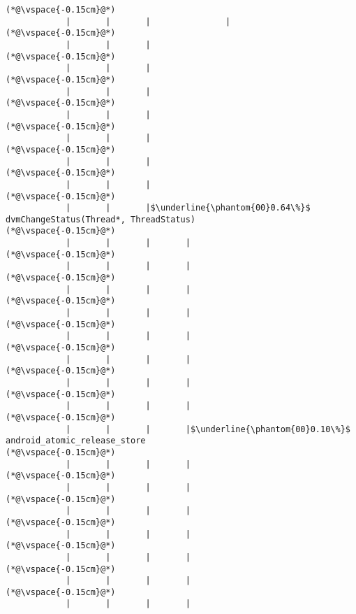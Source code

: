 \begin{lstlisting}[caption=20 viiteparametria Java$\to$C , label=profile:J2CBenchmark00206, numberbychapter=true, frame=lines, float, floatplacement=t]
(*@\vspace{-0.15cm}@*)
            |       |       |               |
(*@\vspace{-0.15cm}@*)
            |       |       |
(*@\vspace{-0.15cm}@*)
            |       |       |
(*@\vspace{-0.15cm}@*)
            |       |       |
(*@\vspace{-0.15cm}@*)
            |       |       |
(*@\vspace{-0.15cm}@*)
            |       |       |
(*@\vspace{-0.15cm}@*)
            |       |       |
(*@\vspace{-0.15cm}@*)
            |       |       |
(*@\vspace{-0.15cm}@*)
            |       |       |$\underline{\phantom{00}0.64\%}$ dvmChangeStatus(Thread*, ThreadStatus)
(*@\vspace{-0.15cm}@*)
            |       |       |       |
(*@\vspace{-0.15cm}@*)
            |       |       |       |
(*@\vspace{-0.15cm}@*)
            |       |       |       |
(*@\vspace{-0.15cm}@*)
            |       |       |       |
(*@\vspace{-0.15cm}@*)
            |       |       |       |
(*@\vspace{-0.15cm}@*)
            |       |       |       |
(*@\vspace{-0.15cm}@*)
            |       |       |       |
(*@\vspace{-0.15cm}@*)
            |       |       |       |
(*@\vspace{-0.15cm}@*)
            |       |       |       |$\underline{\phantom{00}0.10\%}$ android_atomic_release_store
(*@\vspace{-0.15cm}@*)
            |       |       |       |
(*@\vspace{-0.15cm}@*)
            |       |       |       |
(*@\vspace{-0.15cm}@*)
            |       |       |       |
(*@\vspace{-0.15cm}@*)
            |       |       |       |
(*@\vspace{-0.15cm}@*)
            |       |       |       |
(*@\vspace{-0.15cm}@*)
            |       |       |       |
(*@\vspace{-0.15cm}@*)
            |       |       |       |

\end{lstlisting}
